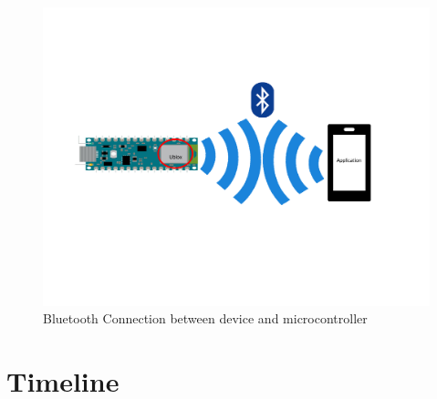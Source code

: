 \documentclass[12pt, titlepage]{article}
\begin{document}
\begin{figure}[H]
  \vspace*{-2cm}
  \includegraphics[width=\textwidth,height=\textheight,keepaspectratio]{BluetoothConnection.pdf}
  \vspace*{-4cm}
  \caption{Bluetooth Connection between device and microcontroller}
  \label{Bluetooth Connection} 
\end{figure}

\section{Timeline}



\newpage{}
\end{document}
